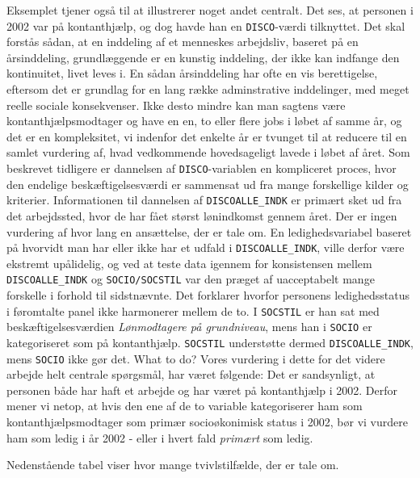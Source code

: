 Eksemplet tjener også til at illustrerer noget andet centralt. Det ses, at personen i 2002 var på kontanthjælp, og dog havde han en \texttt{DISCO}-værdi tilknyttet. Det skal forstås sådan, at en inddeling af et menneskes arbejdsliv, baseret på en årsinddeling, grundlæggende er en kunstig inddeling, der ikke kan indfange den kontinuitet, livet leves i. En sådan årsinddeling har ofte en vis berettigelse, eftersom det er grundlag for en lang række adminstrative inddelinger, med meget reelle sociale konsekvenser. Ikke desto mindre kan man sagtens være kontanthjælpsmodtager og have en en, to eller flere jobs i løbet af samme år, og det er en kompleksitet, vi indenfor det enkelte år er tvunget til at reducere til en samlet vurdering af, hvad vedkommende hovedsageligt lavede i løbet af året. Som beskrevet tidligere er dannelsen af \texttt{DISCO}-variablen en kompliceret proces, hvor den endelige beskæftigelsesværdi er sammensat ud fra mange forskellige kilder og kriterier. Informationen til dannelsen af \texttt{DISCOALLE\_INDK} er primært sket ud fra det arbejdssted, hvor de har fået størst lønindkomst gennem året. Der er ingen vurdering af hvor lang en ansættelse, der er tale om. En ledighedsvariabel baseret på hvorvidt man har eller ikke har et udfald i \texttt{DISCOALLE\_INDK}, ville derfor være ekstremt upålidelig, og ved at teste data igennem for konsistensen mellem \texttt{DISCOALLE\_INDK} og \texttt{SOCIO/SOCSTIL} var den præget af uacceptabelt mange forskelle i forhold til sidstnævnte. Det forklarer hvorfor personens ledighedsstatus i føromtalte panel ikke harmonerer mellem de to. I \texttt{SOCSTIL} er han sat med beskæftigelsesværdien \emph{Lønmodtagere på grundniveau}, mens han i \texttt{SOCIO} er kategoriseret som på kontanthjælp. \texttt{SOCSTIL} understøtte dermed \texttt{DISCOALLE\_INDK}, mens \texttt{SOCIO} ikke gør det. What to do? Vores vurdering i dette for det videre arbejde helt centrale spørgsmål, har været følgende: Det er sandsynligt, at personen både har haft et arbejde og har været på kontanthjælp i 2002. Derfor mener vi netop, at hvis den ene af de to variable kategoriserer ham som kontanthjælpsmodtager som primær socioøkonimisk status i 2002, bør vi vurdere ham som ledig i år 2002 - eller i hvert fald \emph{primært} som ledig.

Nedenstående tabel viser hvor mange tvivlstilfælde, der er tale om. 





